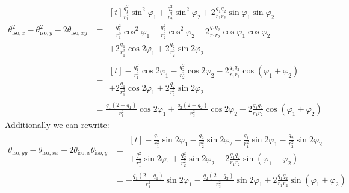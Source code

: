 \documentclass[reqno]{article}
\begin{document}
\begin{equation}
\begin{split}
    \theta_{\text{iso}, x}^2
    - \theta_{\text{iso}, y}^2
    - 2 \theta_{\text{iso}, xy}
    &=
    \begin{multlined}[t]
        \frac{q_1^2}{r_1^2} \sin^2 \varphi_1
        + \frac{q_2^2}{r_2^2} \sin^2 \varphi_2
        + 2 \frac{q_1 q_2}{r_1 r_2} \sin \varphi_1 \sin \varphi_2 \\
        - \frac{q_1^2}{r_1^2} \cos^2 \varphi_1
        - \frac{q_2^2}{r_2^2} \cos^2 \varphi_2
        - 2 \frac{q_1 q_2}{r_1 r_2} \cos \varphi_1 \cos \varphi_2 \\
        +2 \frac{q_1}{r_1^2} \cos 2\varphi_1
        +2 \frac{q_2}{r_2^2} \sin 2\varphi_2 
    \end{multlined} \\
    &= 
    \begin{multlined}[t]
        -\frac{q_1^2}{r_1^2} \cos 2\varphi_1
        - \frac{q_2^2}{r_2^2} \cos 2\varphi_2
        - 2 \frac{q_1 q_2}{r_1 r_2} \cos \left(\varphi_1 + \varphi_2\right) \\
        +2 \frac{q_1}{r_1^2} \cos 2\varphi_1
        +2 \frac{q_2}{r_2^2} \sin 2\varphi_2 
    \end{multlined} \\
    &=
    \frac{q_1 \left(2 - q_1 \right)}{r_1^2} \cos 2\varphi_1
    + \frac{q_2 \left(2 - q_2 \right)}{r_2^2} \cos 2\varphi_2
    - 2 \frac{q_1 q_2}{r_1 r_2} \cos \left(\varphi_1 + \varphi_2\right)
\end{split}
\end{equation}
Additionally we can rewrite:
\begin{equation}
\begin{split}
    \theta_{\text{iso}, yy}
    - \theta_{\text{iso}, xx}
    - 2 \theta_{\text{iso}, x} \theta_{\text{iso}, y}
    &=
    \begin{multlined}[t]
        -\frac{q_1}{r_1^2} \sin 2 \varphi_1 
        -\frac{q_2}{r_2^2} \sin 2 \varphi_2 
        - \frac{q_1}{r_1^2} \sin 2 \varphi_1
        - \frac{q_2}{r_2^2} \sin 2 \varphi_2 \\
        + \frac{q_1^2}{r_1^2} \sin 2 \varphi_1 
        +  \frac{q_2^2}{r_2^2} \sin2 \varphi_2
        + 2 \frac{q_1 q_2}{r_1 r_2}\sin\left(\varphi_1 + \varphi_2\right) 
    \end{multlined} \\
    &=
    -\frac{q_1 \left(2 - q_1\right)}{r_1^2} \sin 2\varphi_1
    - \frac{q_2 \left(2 - q_2\right)}{r_2^2} \sin 2\varphi_1
    + 2 \frac{q_1 q_2}{r_1 r_2}\sin\left(\varphi_1 + \varphi_2\right) 
\end{split}
\end{equation}
\end{document}
